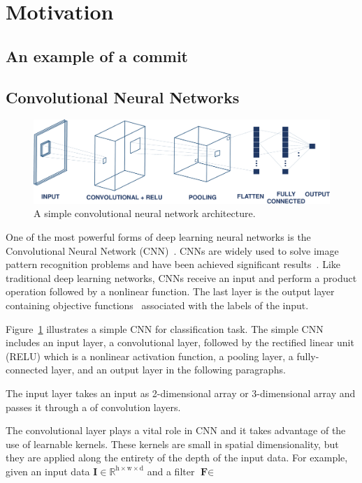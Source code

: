 
\section{Motivation}
\label{sec:motivation}

\subsection{An example of a commit }
\label{sec:examle}

\subsection{Convolutional Neural Networks}
\label{sec:background_cnn}

\begin{figure}[t!]
\center
\includegraphics[scale=0.3]{figs/cnn.pdf}
\caption{A simple convolutional neural network architecture.}
\label{fig:cnn}
\end{figure}

One of the most powerful forms of deep learning neural networks is the Convolutional Neural Network (CNN)~\cite{lecun2015deep}. CNNs are widely used to solve image pattern recognition problems and have been achieved significant results~\cite{karpathy2014large, lawrence1997face, krizhevsky2012imagenet}. Like traditional deep learning networks, CNNs receive an input and perform a product operation followed by a nonlinear function. The last layer is the output layer containing objective functions~\cite{zhao2017loss} associated with the labels of the input.

Figure~\ref{fig:cnn} illustrates a simple CNN for classification task. The simple CNN includes an input layer, a convolutional layer, followed by the rectified linear unit (RELU) which is a nonlinear activation function, a pooling layer, a fully-connected layer, and an output layer in the following paragraphs. 

The input layer takes an input as 2-dimensional array or 3-dimensional array and passes it through a of convolution layers.

The convolutional layer plays a vital role in CNN and it takes advantage of the use of learnable kernels. These kernels are small in spatial dimensionality, but they are applied along the entirety of the depth of the input data. For example, given an input data $\textbf{I} \in \mathbb{R}^{\text{h} \times \text{w} \times \text{d}}$ and a filter $\textbf{F} \in $

